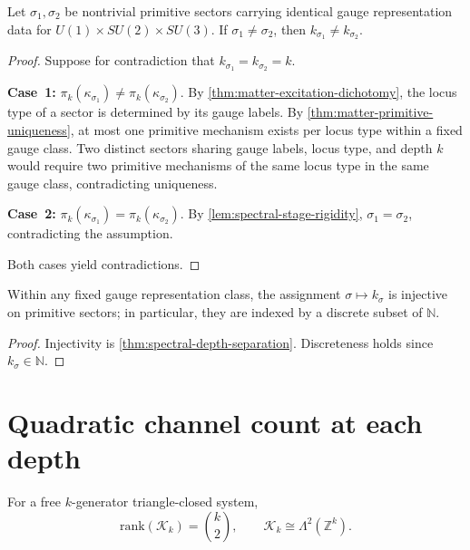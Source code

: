 \begin{theorem}
\label{thm:spectral-depth-separation}
Let $\sigma_1, \sigma_2$ be nontrivial primitive sectors carrying
identical gauge representation data for
$U(1)\times SU(2)\times SU(3)$.
If $\sigma_1 \neq \sigma_2$, then $k_{\sigma_1} \neq k_{\sigma_2}$.
\end{theorem}

\begin{proof}
Suppose for contradiction that $k_{\sigma_1} = k_{\sigma_2} = k$.

\textbf{Case~1:} $\pi_k(\kappa_{\sigma_1}) \neq \pi_k(\kappa_{\sigma_2})$.
By \cref{thm:matter-excitation-dichotomy}, the locus type of a sector is
determined by its gauge labels.
By \cref{thm:matter-primitive-uniqueness}, at most one primitive mechanism
exists per locus type within a fixed gauge class.
Two distinct sectors sharing gauge labels, locus type, and depth $k$
would require two primitive mechanisms of the same locus type in the same
gauge class, contradicting uniqueness.

\textbf{Case~2:} $\pi_k(\kappa_{\sigma_1}) = \pi_k(\kappa_{\sigma_2})$.
By \cref{lem:spectral-stage-rigidity}, $\sigma_1 = \sigma_2$,
contradicting the assumption.

Both cases yield contradictions.
\end{proof}

\begin{corollary}
\label{cor:spectral-hierarchy}
Within any fixed gauge representation class, the assignment
$\sigma \mapsto k_\sigma$ is injective on primitive sectors;
in particular, they are indexed by a discrete subset of $\mathbb N$.
\end{corollary}

\begin{proof}
Injectivity is \cref{thm:spectral-depth-separation}.
Discreteness holds since $k_\sigma \in \mathbb N$.
\end{proof}

\section{Quadratic channel count at each depth}
\label{sec:spectral-dimension}

\begin{theorem}
\label{thm:spectral-binomial}
For a free $k$-generator triangle-closed system,
\[
  \mathrm{rank}(\mathcal K_k) = \binom{k}{2},
  \qquad
  \mathcal K_k \cong \Lambda^2(\mathbb Z^k).
\]
\end{theorem}

